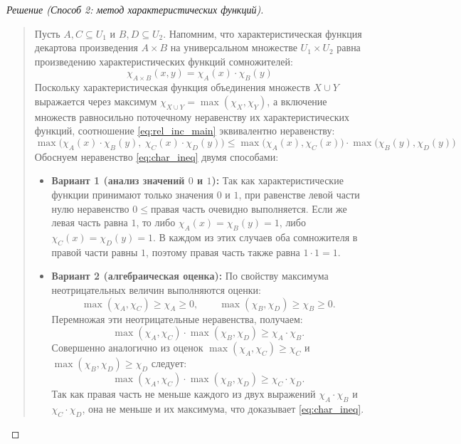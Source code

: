 \begin{proof}[Решение (Способ 2: метод характеристических функций)]~\\
    \begin{quote}
        Пусть $A, C \subseteq U_1$ и $B, D \subseteq U_2$. Напомним, что 
        характеристическая функция декартова произведения $A \times B$ на 
        универсальном множестве $U_1 \times U_2$ равна произведению 
        характеристических функций сомножителей:
        \begin{equation} \label{eq:char_cart}
            \chi_{A \times B}(x, y) = \chi_A(x) \cdot \chi_B(y) \tag{2}
        \end{equation}
        Поскольку характеристическая функция объединения множеств $X \cup Y$ 
        выражается через максимум $\chi_{X \cup Y} = \max(\chi_X, \chi_Y)$, 
        а включение множеств равносильно поточечному неравенству их 
        характеристических функций, соотношение \eqref{eq:rel_inc_main} 
        эквивалентно неравенству:
        \begin{equation} \label{eq:char_ineq}
            \max\bigl(\chi_A(x) \cdot \chi_B(y), \ 
            \chi_C(x) \cdot \chi_D(y)\bigr) \le 
            \max\bigl(\chi_A(x), \chi_C(x)\bigr) \cdot 
            \max\bigl(\chi_B(y), \chi_D(y)\bigr) \tag{3}
        \end{equation}
        Обоснуем неравенство \eqref{eq:char_ineq} двумя способами:
        \begin{itemize}
            \item \textbf{Вариант 1 (анализ значений $0$ и $1$):} 
            Так как характеристические функции принимают только значения 
            $0$ и $1$, при равенстве левой части нулю неравенство 
            $0 \le \text{правая часть}$ очевидно выполняется. Если же 
            левая часть равна $1$, то либо $\chi_A(x) = \chi_B(y) = 1$, 
            либо $\chi_C(x) = \chi_D(y) = 1$. В каждом из этих случаев 
            оба сомножителя в правой части равны $1$, поэтому правая часть 
            также равна $1 \cdot 1 = 1$.
            \item \textbf{Вариант 2 (алгебраическая оценка):} 
            По свойству максимума неотрицательных величин выполняются 
            оценки:
            \[
                \max(\chi_A, \chi_C) \ge \chi_A \ge 0, \qquad
                \max(\chi_B, \chi_D) \ge \chi_B \ge 0.
            \]
            Перемножая эти неотрицательные неравенства, получаем:
            \[
                \max(\chi_A, \chi_C) \cdot \max(\chi_B, \chi_D) \ge 
                \chi_A \cdot \chi_B.
            \]
            Совершенно аналогично из оценок $\max(\chi_A, \chi_C) \ge \chi_C$ 
            и $\max(\chi_B, \chi_D) \ge \chi_D$ следует:
            \[
                \max(\chi_A, \chi_C) \cdot \max(\chi_B, \chi_D) \ge 
                \chi_C \cdot \chi_D.
            \]
            Так как правая часть не меньше каждого из двух выражений 
            $\chi_A \cdot \chi_B$ и $\chi_C \cdot \chi_D$, она не меньше 
            и их максимума, что доказывает \eqref{eq:char_ineq}.
        \end{itemize}
    \end{quote}
\end{proof}

